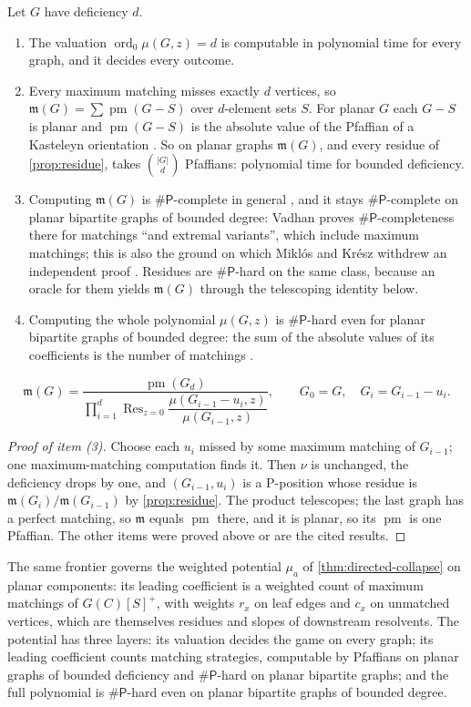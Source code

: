 \documentclass[final]{siamart0516}
\numberwithin{theorem}{section}
\numberwithin{equation}{section}
\theoremstyle{siamnonum}
\theoremstyle{plain}
\newcommand{\mm}{\mathfrak{m}}            %
\newcommand{\ord}{\operatorname{ord}}
\newcommand{\Res}{\operatorname{Res}}
\newcommand{\cls}[1]{\mathsf{#1}}
\newcommand{\sharpP}{\#\cls{P}}
\begin{document}
\begin{theorem}\label{thm:kasteleyn}
Let $G$ have deficiency $d$.
\begin{enumerate}[label=\textup{(\arabic*)}]
\item The valuation $\ord_0\mu(G,z)=d$ is computable in polynomial time for every graph, and it decides every outcome.
\item Every maximum matching misses exactly $d$ vertices, so $\mm(G)=\sum\operatorname{pm}(G-S)$ over $d$-element sets $S$. For planar $G$ each $G-S$ is planar and $\operatorname{pm}(G-S)$ is the absolute value of the Pfaffian of a Kasteleyn orientation \cite{TemperleyFisher,Kasteleyn}. So on planar graphs $\mm(G)$, and every residue of \cref{prop:residue}, takes $\binom{|G|}{d}$ Pfaffians: polynomial time for bounded deficiency.
\item Computing $\mm(G)$ is $\sharpP$-complete in general \cite{Valiant}, and it stays $\sharpP$-complete on planar bipartite graphs of bounded degree: Vadhan \cite{Vadhan} proves $\sharpP$-completeness there for matchings ``and extremal variants'', which include maximum matchings; this is also the ground on which Mikl\'os and Kr\'esz withdrew an independent proof \cite{MiklosKresz}. Residues are $\sharpP$-hard on the same class, because an oracle for them yields $\mm(G)$ through the telescoping identity below.
\item Computing the whole polynomial $\mu(G,z)$ is $\sharpP$-hard even for planar bipartite graphs of bounded degree: the sum of the absolute values of its coefficients is the number of matchings \cite{Jerrum,Vadhan}.
\end{enumerate}
\[
\mm(G)=\frac{\operatorname{pm}(G_d)}{\prod_{i=1}^{d}\Res_{z=0}\dfrac{\mu(G_{i-1}-u_i,z)}{\mu(G_{i-1},z)}},\qquad G_0=G,\quad G_i=G_{i-1}-u_i.
\]
\end{theorem}
\begin{proof}[Proof of item \textup{(3)}]
Choose each $u_i$ missed by some maximum matching of $G_{i-1}$; one maximum-matching computation finds it. Then $\nu$ is unchanged, the deficiency drops by one, and $(G_{i-1},u_i)$ is a P-position whose residue is $\mm(G_i)/\mm(G_{i-1})$ by \cref{prop:residue}. The product telescopes; the last graph has a perfect matching, so $\mm$ equals $\operatorname{pm}$ there, and it is planar, so its $\operatorname{pm}$ is one Pfaffian. The other items were proved above or are the cited results.
\end{proof}

The same frontier governs the weighted potential $\mu_a$ of \cref{thm:directed-collapse} on planar components: its leading coefficient is a weighted count of maximum matchings of $G(C)[S]^{+}$, with weights $r_x$ on leaf edges and $c_x$ on unmatched vertices, which are themselves residues and slopes of downstream resolvents. The potential has three layers: its valuation decides the game on every graph; its leading coefficient counts matching strategies, computable by Pfaffians on planar graphs of bounded deficiency and $\sharpP$-hard on planar bipartite graphs; and the full polynomial is $\sharpP$-hard even on planar bipartite graphs of bounded degree.
\end{document}
